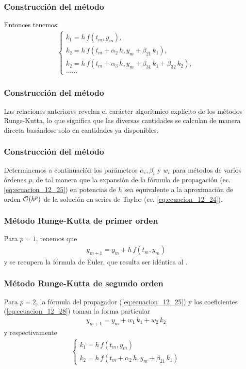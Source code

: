 \begin{frame}
\frametitle{Construcción del método}
Entonces tenemos:
\begin{align}
\begin{cases}
k_{1} = h \, f(t_{m}, y_{m}), \\[0.5em]
k_{2} = h \, f(t_{m} + \alpha_{2} \, h, y_{m} + \beta_{21} \, k_{1}), \\[0.5em]
k_{2} = h \, f(t_{m} + \alpha_{3} \, h, y_{m} + \beta_{31} \, k_{1} + \beta_{32} \, k_{2}), \\[0.5em]
\ldots \ldots
\end{cases}
\label{eq:ecuacion_12_28}
\end{align}
\end{frame}
\begin{frame}
\frametitle{Construcción del método}
Las relaciones anteriores revelan el carácter algorítmico explícito de los métodos Runge-Kutta, lo que significa que las diversas cantidades se calculan de manera directa basándose solo en cantidades ya disponibles.
\end{frame}
\begin{frame}
\frametitle{Construcción del método}
Determinemos a continuación los parámetros $\alpha_{i}, \beta_{i}$ y $w_{i}$ para métodos de varios órdenes $p$, de tal manera que la expansión de la fórmula de propagación (ec. \ref{eq:ecuacion_12_25}) en potencias de $h$ sea equivalente a la aproximación de orden $\order{h^{p}}$ de la solución en series de Taylor (ec. \ref{eq:ecuacion_12_24}).
\end{frame}
\begin{frame}
\frametitle{Método Runge-Kutta de primer orden}
Para $p = 1$, tenemos que
\begin{align}
y_{m+1} = y_{m} + h \, f(t_{m}, y_{m})
\label{eq:ecuacion_12_29}
\end{align}
y se recupera la fórmula de Euler, que resulta ser idéntica al .
\end{frame}
\begin{frame}
\frametitle{Método Runge-Kutta de segundo orden}
Para $p = 2$, la fórmula del propagador (\ref{eq:ecuacion_12_25}) y los coeficientes (\ref{eq:ecuacion_12_28}) toman la forma particular
\begin{align*}
y_{m+1} = y_{m} +  w_{1} \, k_{1} + w_{2} \, k_{2}
\end{align*}
y respectivamente
\begin{align*}
\begin{cases}
k_{1} = h \, f(t_{m}, y_{m}) \\[0.5em]
k_{2} = h \, f(t_{m} + \alpha_{2} \, h, y_{m} + \beta_{21} \, k_{1})
\end{cases}
\end{align*}
\end{frame}
